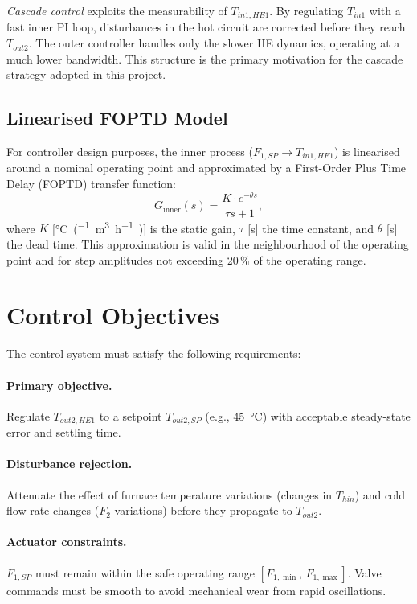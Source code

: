 \textit{Cascade control} exploits the measurability of $T_{in1,HE1}$. By regulating $T_{in1}$
with a fast inner PI loop, disturbances in the hot circuit are corrected before they reach
$T_{out2}$. The outer controller handles only the slower HE dynamics, operating at a
much lower bandwidth. This structure is the primary motivation for the cascade strategy
adopted in this project.

\subsection{Linearised FOPTD Model}

For controller design purposes, the inner process ($F_{1,SP} \rightarrow T_{in1,HE1}$) is
linearised around a nominal operating point and approximated by a First-Order Plus Time Delay
(FOPTD) transfer function:
\begin{equation}
  G_{\text{inner}}(s) = \frac{K \cdot e^{-\theta s}}{\tau s + 1},
  \label{eq:foptd}
\end{equation}
where $K$ [\si{\degreeCelsius\per(\metre\cubed\per\hour)}] is the static gain, $\tau$
[\si{\second}] the time constant, and $\theta$ [\si{\second}] the dead time.
This approximation is valid in the neighbourhood of the operating point and for step
amplitudes not exceeding 20\,\% of the operating range.

\section{Control Objectives}

The control system must satisfy the following requirements:

\paragraph{Primary objective.}
Regulate $T_{out2,HE1}$ to a setpoint $T_{out2,SP}$ (e.g., \SI{45}{\degreeCelsius})
with acceptable steady-state error and settling time.

\paragraph{Disturbance rejection.}
Attenuate the effect of furnace temperature variations (changes in $T_{hin}$) and cold
flow rate changes ($F_2$ variations) before they propagate to $T_{out2}$.

\paragraph{Actuator constraints.}
$F_{1,SP}$ must remain within the safe operating range $[F_{1,\min},\, F_{1,\max}]$.
Valve commands must be smooth to avoid mechanical wear from rapid oscillations.


